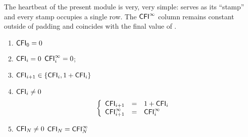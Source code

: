 The heartbeat of the present module is very, very simple: \cfi{} serves as its ``stamp'' and every stamp occupies a single row. The $\textsf{CFI}^\infty$ column remains constant outside of padding and coincides with the final value of \cfi{}.
\begin{enumerate}
	\item $\textsf{CFI}_{0} = 0$
	\item \If $\textsf{CFI}_{i} = 0$ \Then $\textsf{CFI}^\infty_{i} = 0$;
	\item $\textsf{CFI}_{i + 1} \in \{ \textsf{CFI}_{i}, 1 + \textsf{CFI}_{i}\}$
	\item \If $\textsf{CFI}_{i} \neq 0$ \Then 
	\[
	\left\{\begin{array}{lcl}
		\textsf{CFI}_{i + 1}       & = & 1 + \textsf{CFI}_{i}   \\
		\textsf{CFI}^\infty_{i + 1}    & = & \textsf{CFI}^\infty_{i}    \\
	\end{array}\right.
	\]
	\item \If $\textsf{CFI}_{N} \neq 0$ \Then $\textsf{CFI}_{N} = \textsf{CFI}^\infty_{N}$
\end{enumerate}
